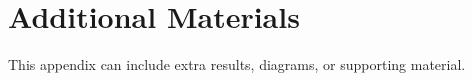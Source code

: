 \chapter{Additional Materials}
This appendix can include extra results, diagrams, or supporting material.
